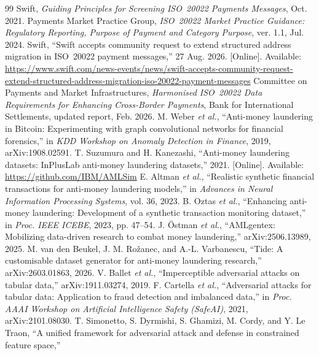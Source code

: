 \documentclass[conference]{IEEEtran}
\begin{document}
\balance
\begin{thebibliography}{99}
\scriptsize
\setlength{\itemsep}{0pt plus 0.2pt}
Swift, \emph{Guiding Principles for Screening ISO~20022 Payments Messages},
Oct. 2021.
Payments Market Practice Group, \emph{ISO~20022 Market Practice Guidance:
Regulatory Reporting, Purpose of Payment and Category Purpose}, ver. 1.1, Jul.
2024.
Swift, ``Swift accepts community request to extend structured address
migration in ISO~20022 payment messages,'' 27 Aug. 2026. [Online]. Available:
\url{https://www.swift.com/news-events/news/swift-accepts-community-request-extend-structured-address-migration-iso-20022-payment-messages}
Committee on Payments and Market Infrastructures, \emph{Harmonised ISO~20022
Data Requirements for Enhancing Cross-Border Payments}, Bank for International
Settlements, updated report, Feb. 2026.
M. Weber \emph{et al.}, ``Anti-money laundering in Bitcoin: Experimenting with
graph convolutional networks for financial forensics,'' in \emph{KDD Workshop
on Anomaly Detection in Finance}, 2019, arXiv:1908.02591.
T. Suzumura and H. Kanezashi, ``Anti-money laundering datasets: InPlusLab
anti-money laundering datasets,'' 2021. [Online]. Available:
\url{https://github.com/IBM/AMLSim}
E. Altman \emph{et al.}, ``Realistic synthetic financial transactions for
anti-money laundering models,'' in \emph{Advances in Neural Information
Processing Systems}, vol. 36, 2023.
B. Oztas \emph{et al.}, ``Enhancing anti-money laundering: Development of a
synthetic transaction monitoring dataset,'' in \emph{Proc. IEEE ICEBE}, 2023,
pp. 47--54.
J. \"Ostman \emph{et al.}, ``AMLgentex: Mobilizing data-driven research to
combat money laundering,'' arXiv:2506.13989, 2025.
M. van den Beukel, J. M. Ro\v{z}anec, and A.-L. Varbanescu, ``Tide: A
customisable dataset generator for anti-money laundering research,''
arXiv:2603.01863, 2026.
V. Ballet \emph{et al.}, ``Imperceptible adversarial attacks on tabular
data,'' arXiv:1911.03274, 2019.
F. Cartella \emph{et al.}, ``Adversarial attacks for tabular data: Application
to fraud detection and imbalanced data,'' in \emph{Proc. AAAI Workshop on
Artificial Intelligence Safety (SafeAI)}, 2021, arXiv:2101.08030.
T. Simonetto, S. Dyrmishi, S. Ghamizi, M. Cordy, and Y. Le Traon, ``A unified
framework for adversarial attack and defense in constrained feature space,''

\end{thebibliography}
\end{document}
